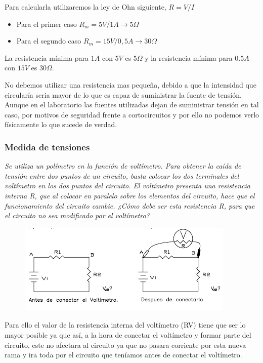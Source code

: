 \documentclass[paper=a4, fontsize=11pt]{scrartcl} %
\numberwithin{equation}{section} %
\numberwithin{figure}{section} %
\numberwithin{table}{section} %
\begin{document}
Para calcularla utilizaremos la ley de Ohn siguiente, $R=V/I$

\begin{itemize}
	\item Para el primer caso $R_{m}=5V/1A \rightarrow 5\Omega$
	\item Para el segundo caso $R_{m}=15V/0,5A \rightarrow 30 \Omega$
\end{itemize}

La resistencia mínima para $1A$ con $5V$ es $5\Omega$ y la resistencia mínima para $0.5A$ con $15V$ es $30 \Omega$. \newline

No debemos utilizar una resistencia mas pequeña, debido a que la intensidad que circularía seria mayor de lo que es capaz de suministrar la fuente de tensión. Aunque en el laboratorio las fuentes utilizadas dejan de suministrar tensión en tal caso, por motivos de seguridad frente a cortocircuitos y por ello no podemos verlo físicamente lo que sucede de verdad. \newline

\subsubsection{Medida de tensiones} 

\textit{Se utiliza un polímetro en la función de voltímetro. Para obtener la caída de tensión entre dos puntos de un circuito, basta colocar los dos terminales del voltímetro en los dos puntos del circuito. El voltímetro presenta una resistencia interna R, que al colocar en paralelo sobre los elementos del circuito, hace que el funcionamiento del circuito cambie. \newline
¿Cómo debe ser esta resistencia R, para que el circuito no sea modificado por el voltímetro?} 

\begin{figure}[h]
	\centering
	\includegraphics{image/medida-tension}
\end{figure}

Para ello el valor de la resistencia interna del voltímetro (RV) tiene que ser lo mayor posible ya que así, a la hora de conectar el voltímetro y formar parte del circuito, este no afectara al circuito ya que no pasara corriente por esta nueva rama y ira toda por el circuito que teníamos antes de conectar el voltímetro. \newline
\end{document}
